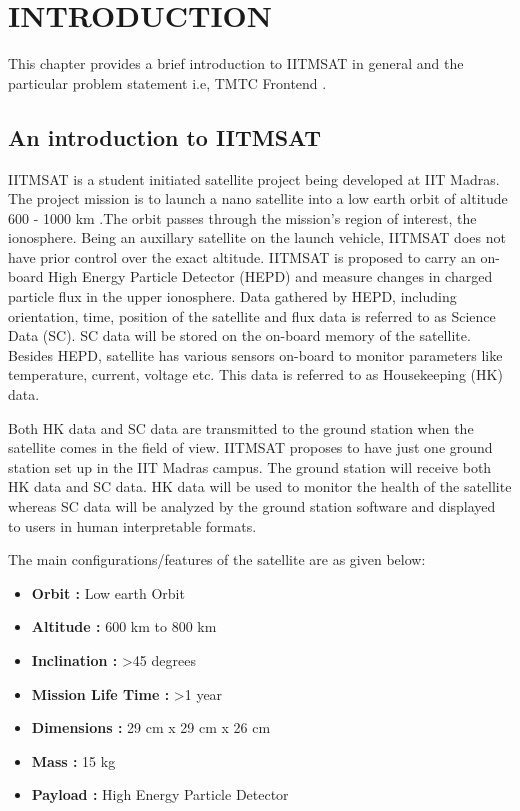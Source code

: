 \documentclass[BTech]{iitmdiss}
\begin{document}



 \chapter{INTRODUCTION}
 \label{chap:intro}
 
\par This chapter provides a brief introduction to IITMSAT in general and the particular problem statement i.e, TMTC Frontend .
 
 \section{An introduction to IITMSAT }
 IITMSAT is a student initiated  satellite project being developed at IIT Madras. The project mission is to launch a nano satellite into a low earth orbit of altitude 600 - 1000 km .The orbit passes through the mission's region of interest, the ionosphere. Being an auxillary satellite on the launch vehicle, IITMSAT does not have prior control over the exact altitude. IITMSAT is proposed to carry an on-board High Energy Particle Detector (HEPD) and measure changes in charged particle flux in the upper ionosphere. Data gathered by HEPD, including orientation, time, position of the satellite and flux data is referred to as Science Data (SC). SC data will be stored on the on-board memory of the satellite. Besides HEPD, satellite has various sensors on-board to monitor parameters like temperature, current, voltage etc. This data is referred to as Housekeeping (HK) data.
 \par Both HK data and SC data are transmitted to the ground station when the satellite comes in the field of view. IITMSAT proposes to have just one ground station set up in the IIT Madras campus. The ground station will receive both HK data and SC data. HK data will be used to monitor the health of the satellite whereas SC data will be analyzed by the ground station software and displayed to users in human interpretable formats.  


The main configurations/features of the satellite are as given below:
\begin{itemize}

\item \textbf{Orbit : } Low earth Orbit
\item \textbf{Altitude : } 600 km to 800 km
\item \textbf{Inclination : } \textgreater  45 degrees 
\item \textbf{Mission Life Time : } \textgreater 1 year 
\item \textbf{Dimensions : }  29 cm x 29 cm x 26 cm
\item \textbf{Mass : } 15 kg
\item \textbf{Payload : } High Energy Particle Detector 
\end{itemize}
 
\end{document}
